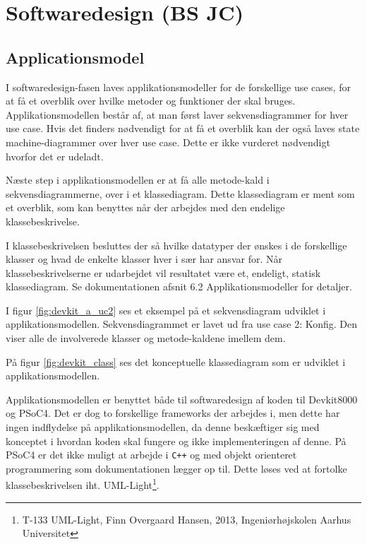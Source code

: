 \section{Softwaredesign (BS JC)}

\subsection{Applicationsmodel}
I softwaredesign-fasen laves applikationsmodeller for de forskellige use cases, for at få et overblik over hvilke metoder og funktioner der skal bruges. Applikationsmodellen består af, at man først laver sekvensdiagrammer for hver use case. Hvis det finders nødvendigt for at få et overblik kan der også laves state machine-diagrammer over hver use case. Dette er ikke vurderet nødvendigt hvorfor det er udeladt.

Næste step i applikationsmodellen er at få alle metode-kald i sekvensdiagrammerne, over i et klassediagram. Dette klassediagram er ment som et overblik, som kan benyttes når der arbejdes med den endelige klassebeskrivelse.

I klassebeskrivelsen besluttes der så hvilke datatyper der ønskes i de forskellige klasser og hvad de enkelte klasser hver i sær har ansvar for. Når klassebeskrivelserne er udarbejdet vil resultatet være et, endeligt, statisk klassediagram. Se dokumentationen afsnit 6.2 Applikationsmodeller for detaljer.


I figur \ref{fig:devkit_a_uc2} ses et eksempel på et sekvensdiagram udviklet i applikationsmodellen. Sekvensdiagrammet er lavet ud fra use case 2: Konfig. Den viser alle de involverede klasser og metode-kaldene imellem dem.

På figur \ref{fig:devkit_class} ses det konceptuelle klassediagram som er udviklet i applikationsmodellen.


Applikationsmodellen er benyttet både til softwaredesign af koden til Devkit8000 og PSoC4. Det er dog to forskellige frameworks der arbejdes i, men dette har ingen indflydelse på applikationsmodellen, da denne beskæftiger sig med konceptet i hvordan koden skal fungere og ikke implementeringen af denne. På PSoC4 er det ikke muligt at arbejde i \verb-C++- og med objekt orienteret programmering som dokumentationen lægger op til. Dette løses ved at fortolke klassebeskrivelsen iht. UML-Light\footnote{T-133 UML-Light, Finn Overgaard Hansen, 2013, Ingeniørhøjskolen Aarhus Universitet}.

